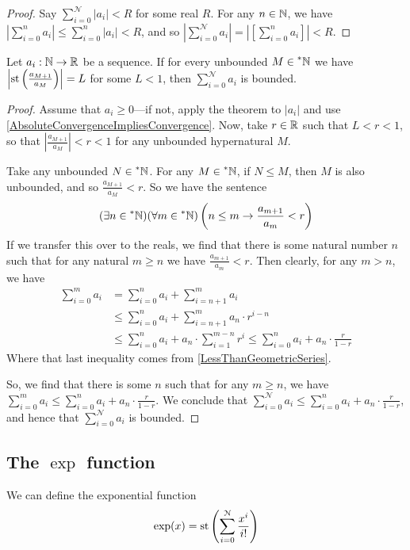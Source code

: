 \begin{proof}
    Say $\sum_{i = 0}^\mathcal{N} |a_i| < R$ for some real $R$. For any $n \in \mathbb{N}$, we have $\left|\sum_{i = 0}^n a_i\right| \leq \sum_{i = 0}^n |a_i| < R$, and so $\left|\sum_{i = 0}^\mathcal{N} a_i\right| = \left|[\sum_{i=0}^n a_i]\right| < R$.
\end{proof}

\begin{thm}\label{RatioTest}
    Let $a_i: \mathbb{N} \to \mathbb{R}$ be a sequence. If for every unbounded $M \in \prescript{*}{}{\mathbb{N}}$ we have $\left|\operatorname{st}\left(\frac{a_{M+1}}{a_M}\right)\right| = L$ for some $L < 1$, then $\sum_{i=0}^\mathcal{N} a_i$ is bounded.
\end{thm}

\begin{proof}
    Assume that $a_i \geq 0$---if not, apply the theorem to $|a_i|$ and use \ref{AbsoluteConvergenceImpliesConvergence}. Now, take $r \in \mathbb{R}$ such that $L < r < 1$, so that $\left|\frac{a_{M+1}}{a_M}\right| < r < 1$ for any unbounded hypernatural $M$.

    Take any unbounded $N \in \prescript{*}{}{\mathbb{N}}$. For any $M \in \prescript{*}{}{\mathbb{N}}$, if $N \leq M$, then $M$ is also unbounded, and so $\frac{a_{M+1}}{a_M} < r$. So we have the sentence
    \[ (\exists n \in \prescript{*}{}{\mathbb{N}})(\forall m \in \prescript{*}{}{\mathbb{N}})\left(n \leq m \to \frac{a_{m+1}}{a_m} < r\right) \]
    If we transfer this over to the reals, we find that there is some natural number $n$ such that for any natural $m \geq n$ we have $\frac{a_{m+1}}{a_m} < r$. Then clearly, for any $m > n$, we have 
    \begin{align*}
    \sum_{i = 0}^m a_i &= \sum_{i = 0}^n a_i + \sum_{i = n+1}^m a_i \\
        &\leq \sum_{i = 0}^n a_i + \sum_{i = n+1}^m a_n \cdot r^{i - n} \\
        &\leq \sum_{i = 0}^n a_i + a_n \cdot \sum_{i = 1}^{m-n}  r^{i} \leq \sum_{i = 0}^n a_i + a_n \cdot \frac{r}{1-r}
    \end{align*}
    Where that last inequality comes from \ref{LessThanGeometricSeries}.

    So, we find that there is some $n$ such that for any $m \geq n$, we have $\sum_{i = 0}^m a_i \leq \sum_{i = 0}^n a_i + a_n \cdot \frac{r}{1-r}$. We conclude that $\sum_{i = 0}^\mathcal{N} a_i \leq \sum_{i = 0}^n a_i + a_n \cdot \frac{r}{1-r}$, and hence that $\sum_{i = 0}^\mathcal{N} a_i$ is bounded.
\end{proof}

\subsection{The $\exp$ function}
We can define the exponential function \[\exp(x) = \operatorname{st}\left(\sum_{i=0}^\mathcal{N} \frac{x^i}{i!}\right)\]

